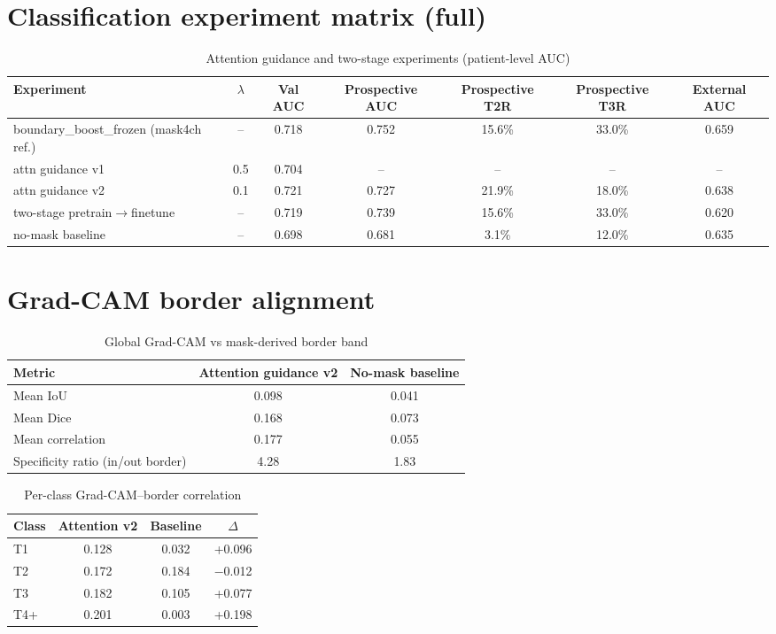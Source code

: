 \documentclass[11pt,a4paper]{article}
\begin{document}
\section{Classification experiment matrix (full)}
\begin{table}[h]
\centering
\caption{Attention guidance and two-stage experiments (patient-level AUC)}
\begin{tabular}{lcccccc}
\toprule
Experiment & $\lambda$ & Val AUC & Prospective AUC & Prospective T2R & Prospective T3R & External AUC \\
\midrule
boundary\_boost\_frozen (mask4ch ref.) & -- & 0.718 & 0.752 & 15.6\% & 33.0\% & 0.659 \\
attn guidance v1 & 0.5 & 0.704 & -- & -- & -- & -- \\
attn guidance v2 & 0.1 & 0.721 & 0.727 & 21.9\% & 18.0\% & 0.638 \\
two-stage pretrain$\rightarrow$finetune & -- & 0.719 & 0.739 & 15.6\% & 33.0\% & 0.620 \\
no-mask baseline & -- & 0.698 & 0.681 & 3.1\% & 12.0\% & 0.635 \\
\bottomrule
\end{tabular}
\end{table}

\section{Grad-CAM border alignment}
\begin{table}[h]
\centering
\caption{Global Grad-CAM vs mask-derived border band}
\begin{tabular}{lcc}
\toprule
Metric & Attention guidance v2 & No-mask baseline \\
\midrule
Mean IoU & 0.098 & 0.041 \\
Mean Dice & 0.168 & 0.073 \\
Mean correlation & 0.177 & 0.055 \\
Specificity ratio (in/out border) & 4.28 & 1.83 \\
\bottomrule
\end{tabular}
\end{table}

\begin{table}[h]
\centering
\caption{Per-class Grad-CAM--border correlation}
\begin{tabular}{lccc}
\toprule
Class & Attention v2 & Baseline & $\Delta$ \\
\midrule
T1 & 0.128 & 0.032 & +0.096 \\
T2 & 0.172 & 0.184 & $-$0.012 \\
T3 & 0.182 & 0.105 & +0.077 \\
T4+ & 0.201 & 0.003 & +0.198 \\
\bottomrule
\end{tabular}
\end{table}
\end{document}
